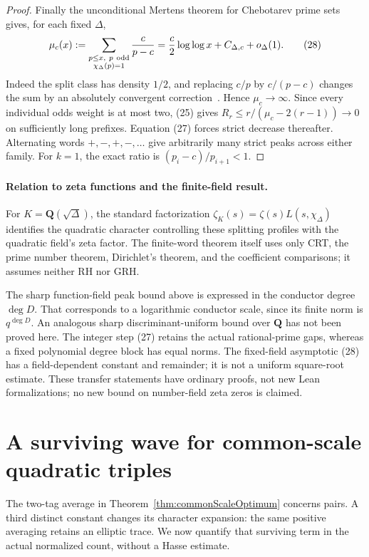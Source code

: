 \documentclass[11pt]{article}
\begin{document}
\begin{proof}
Finally the unconditional Mertens theorem for Chebotarev prime sets
gives, for each fixed \(\Delta\),
\[
 \mu_c(x):=
 \sum_{\substack{p\leq x,\ p\ {\rm odd}\\\chi_\Delta(p)=1}}
          \frac c{p-c}
       =\frac c2\log\log x+C_{\Delta,c}+o_\Delta(1).
                                                               \tag{28}
\]
Indeed the split class has density \(1/2\), and replacing \(c/p\)
by \(c/(p-c)\) changes the sum by an absolutely convergent
correction~\cite{AKK}. Hence \(\mu_c\to\infty\).
Since every individual odds weight is at most two, (25) gives
\(R_r\leq r/(\mu_c-2(r-1))\to0\) on sufficiently long prefixes.
Equation (27) forces strict decrease thereafter.
Alternating words \(+,-,+,-,\ldots\) give arbitrarily many strict
peaks across either family. For \(k=1\), the exact ratio is
\((p_i-c)/p_{i+1}<1\).
\end{proof}

\paragraph{Relation to zeta functions and the finite-field result.}
For \(K=\mathbf Q(\sqrt\Delta)\), the standard factorization
\(\zeta_K(s)=\zeta(s)L(s,\chi_\Delta)\) identifies the quadratic
character controlling these splitting profiles with the quadratic
field's zeta factor. The finite-word theorem itself uses only CRT,
the prime number theorem, Dirichlet's theorem, and the coefficient
comparisons; it assumes neither RH nor GRH.

The sharp function-field peak bound above is expressed in the
conductor degree \(\deg D\). That corresponds to a logarithmic
conductor scale, since its finite norm is \(q^{\deg D}\).
An analogous sharp discriminant-uniform bound over \(\mathbf Q\)
has not been proved here. The integer step (27) retains the actual
rational-prime gaps, whereas a fixed polynomial degree block has
equal norms. The fixed-field asymptotic (28) has a field-dependent
constant and remainder; it is not a uniform square-root estimate.
These transfer statements have ordinary proofs, not new Lean
formalizations; no new bound on number-field zeta zeros is claimed.

\section{A surviving wave for common-scale quadratic triples}

The two-tag average in Theorem~\ref{thm:commonScaleOptimum} concerns
pairs. A third distinct constant changes its character expansion:
the same positive averaging retains an elliptic trace. We now quantify
that surviving term in the actual normalized count, without a Hasse
estimate.
\end{document}

